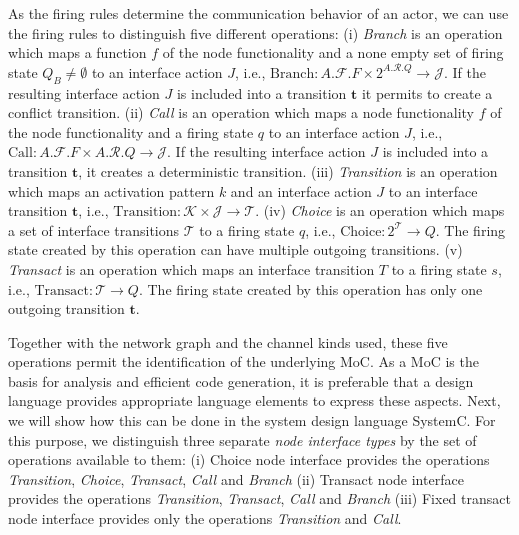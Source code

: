 As the firing rules determine the communication behavior of an actor, we
can use the firing rules to distinguish five different operations:
(i) \emph{Branch} is an operation which maps a function $f$ of the node functionality and
a none empty set of firing state $Q_B \ne \emptyset$ to an interface action $J$,
i.e., $\textrm{Branch}: A.\mathcal{F}.F \times 2^{A.\mathcal{R}.Q} \to \mathcal{J}$.
If the resulting interface action $J$ is included into a transition
$\mathbf{t}$ it permits to create a conflict transition.
(ii) \emph{Call} is an operation which maps a node functionality $f$ of the node functionality and
a firing state $q$ to an interface action $J$,
i.e., $\textrm{Call}: A.\mathcal{F}.F \times A.\mathcal{R}.Q \to \mathcal{J}$.
If the resulting interface action $J$ is included into a
transition $\mathbf{t}$, it creates a deterministic transition.
(iii) \emph{Transition} is an operation which maps an activation pattern $k$ and
an interface action $J$ to an interface transition $\mathbf{t}$,
i.e., $\textrm{Transition}: \mathcal{K} \times \mathcal{J} \to \mathcal{T}$.
(iv) \emph{Choice} is an operation which maps a set of interface transitions $\mathcal{T}$
to a firing state $q$,
i.e., $\textrm{Choice}: 2^{\mathcal{T}} \to Q$.
The firing state created by this operation can have multiple outgoing
transitions.
(v) \emph{Transact} is an operation which maps an interface transition $T$
to a firing state $s$,
i.e., $\textrm{Transact}: \mathcal{T} \to Q$.
The firing state created by this operation has only one outgoing
transition $\mathbf{t}$.

Together with the network graph and the channel kinds used, these five operations
permit the identification of the underlying MoC. As a MoC is the basis for
analysis and efficient code generation, it is preferable that a design
language provides appropriate language elements to express these aspects.
Next, we will show how this can be done in the system design language SystemC.
For this purpose, we distinguish three separate \emph{node interface types}
by the set of operations available to them:
(i) Choice node interface provides the operations
\emph{Transition}, \emph{Choice}, \emph{Transact}, \emph{Call} and \emph{Branch}
(ii) Transact node interface provides the operations
\emph{Transition}, \emph{Transact}, \emph{Call} and \emph{Branch}
(iii) Fixed transact node interface provides only the operations
\emph{Transition} and \emph{Call}.

